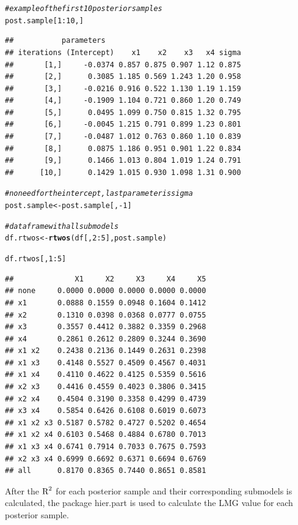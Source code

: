 \documentclass[11pt,a4paper,twoside]{book}\usepackage[]{graphicx}\usepackage[]{color}
\makeatletter
\newcommand{\hlnum}[1]{\textcolor[rgb]{0.686,0.059,0.569}{#1}}%
\newcommand{\hlcom}[1]{\textcolor[rgb]{0.678,0.584,0.686}{\textit{#1}}}%
\newcommand{\hlopt}[1]{\textcolor[rgb]{0,0,0}{#1}}%
\newcommand{\hlstd}[1]{\textcolor[rgb]{0.345,0.345,0.345}{#1}}%
\newcommand{\hlkwb}[1]{\textcolor[rgb]{0.69,0.353,0.396}{#1}}%
\newcommand{\hlkwd}[1]{\textcolor[rgb]{0.737,0.353,0.396}{\textbf{#1}}}%
\newenvironment{kframe}{%
 \def\at@end@of@kframe{}%
 \ifinner\ifhmode%
  \def\at@end@of@kframe{\end{minipage}}%
  \begin{minipage}{\columnwidth}%
 \fi\fi%
 \def\FrameCommand##1{\hskip\@totalleftmargin \hskip-\fboxsep
 \colorbox{shadecolor}{##1}\hskip-\fboxsep
     \hskip-\linewidth \hskip-\@totalleftmargin \hskip\columnwidth}%
 \MakeFramed {\advance\hsize-\width
   \@totalleftmargin\z@ \linewidth\hsize
   \@setminipage}}%
 {\par\unskip\endMakeFramed%
 \at@end@of@kframe}
\newenvironment{knitrout}{}{} %
\makeatother
\begin{document}
\begin{knitrout}
\begin{kframe}
\begin{alltt}
\hlcom{#example of the first 10 posterior samples}
\hlstd{post.sample[}\hlnum{1}\hlopt{:}\hlnum{10}\hlstd{,]}
\end{alltt}
\begin{verbatim}
##           parameters
## iterations (Intercept)    x1    x2    x3   x4 sigma
##       [1,]     -0.0374 0.857 0.875 0.907 1.12 0.875
##       [2,]      0.3085 1.185 0.569 1.243 1.20 0.958
##       [3,]     -0.0216 0.916 0.522 1.130 1.19 1.159
##       [4,]     -0.1909 1.104 0.721 0.860 1.20 0.749
##       [5,]      0.0495 1.099 0.750 0.815 1.32 0.795
##       [6,]     -0.0045 1.215 0.791 0.899 1.23 0.801
##       [7,]     -0.0487 1.012 0.763 0.860 1.10 0.839
##       [8,]      0.0875 1.186 0.951 0.901 1.22 0.834
##       [9,]      0.1466 1.013 0.804 1.019 1.24 0.791
##      [10,]      0.1429 1.015 0.930 1.098 1.31 0.900
\end{verbatim}
\begin{alltt}
\hlcom{#no need for the intercept, last parameter is sigma}
\hlstd{post.sample} \hlkwb{<-} \hlstd{post.sample[,}\hlopt{-}\hlnum{1}\hlstd{]}


\hlcom{#data frame with all submodels}
\hlstd{df.rtwos} \hlkwb{<-}\hlkwd{rtwos}\hlstd{(df[,}\hlnum{2}\hlopt{:}\hlnum{5}\hlstd{], post.sample)}

\hlstd{df.rtwos[,}\hlnum{1}\hlopt{:}\hlnum{5}\hlstd{]}
\end{alltt}
\begin{verbatim}
##              X1     X2     X3     X4     X5
## none     0.0000 0.0000 0.0000 0.0000 0.0000
## x1       0.0888 0.1559 0.0948 0.1604 0.1412
## x2       0.1310 0.0398 0.0368 0.0777 0.0755
## x3       0.3557 0.4412 0.3882 0.3359 0.2968
## x4       0.2861 0.2612 0.2809 0.3244 0.3690
## x1 x2    0.2438 0.2136 0.1449 0.2631 0.2398
## x1 x3    0.4148 0.5527 0.4509 0.4567 0.4031
## x1 x4    0.4110 0.4622 0.4125 0.5359 0.5616
## x2 x3    0.4416 0.4559 0.4023 0.3806 0.3415
## x2 x4    0.4504 0.3190 0.3358 0.4299 0.4739
## x3 x4    0.5854 0.6426 0.6108 0.6019 0.6073
## x1 x2 x3 0.5187 0.5782 0.4727 0.5202 0.4654
## x1 x2 x4 0.6103 0.5468 0.4884 0.6780 0.7013
## x1 x3 x4 0.6741 0.7914 0.7033 0.7675 0.7593
## x2 x3 x4 0.6999 0.6692 0.6371 0.6694 0.6769
## all      0.8170 0.8365 0.7440 0.8651 0.8581
\end{verbatim}
\end{kframe}
\end{knitrout}

After the $\text{R}^2$ for each posterior sample and their corresponding submodels is calculated, the package hier.part is used to calculate the LMG value for each posterior sample.
\end{document}
